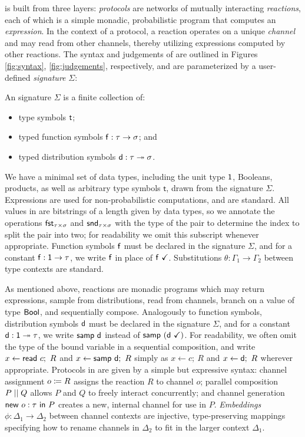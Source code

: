 \ipdl is built from three layers: \emph{protocols} are networks of
mutually interacting \emph{reactions}, each of which is a simple monadic, probabilistic program that computes an \emph{expression}. In the context of a protocol, a reaction operates on a unique \emph{channel} and may read from other channels, thereby utilizing expressions computed by other reactions. The syntax and judgements of \ipdl are outlined in Figures \ref{fig:syntax}, \ref{fig:judgements}, respectively, and are parameterized by a user-defined \emph{signature} $\Sigma$:

\begin{definition}[Signature]
An \ipdl signature $\Sigma$ is a finite collection of:
\begin{itemize}
\item type symbols $\mathsf{t}$;
\item typed function symbols $\mathsf{f} : \tau \rightarrow \sigma$; and
\item typed distribution symbols $\mathsf{d} : \tau \twoheadrightarrow \sigma$.
\end{itemize}
\end{definition}

We have a minimal set of data types, including the unit type $\mathsf{1}$, Booleans, products, as well as arbitrary type symbols $\mathsf{t}$, drawn from the signature $\Sigma$. Expressions are used for non-probabilistic computations, and are standard. All values in \ipdl are bitstrings of a length given by data types, so we annotate the operations $\mathsf{fst}_{\tau \times \sigma}$ and $\mathsf{snd}_{\tau \times \sigma}$ with the type of the pair to determine the index to split the pair into two; for readability we omit this subscript whenever appropriate. Function symbols $\mathsf{f}$ must be declared in the signature $\Sigma$, and for a constant $\mathsf{f} : \mathsf{1} \rightarrow \tau$, we write $\mathsf{f}$ in place of $\mathsf{f} \ \checkmark$. Substitutions $\theta : \Gamma_1 \to \Gamma_2$ between type contexts are standard.

As mentioned above, reactions are monadic programs which may return expressions, sample from distributions, read from channels, branch on a value of type $\mathsf{Bool}$, and sequentially compose. Analogously to function symbols, distribution symbols $\mathsf{d}$ must be declared in the signature $\Sigma$, and for a constant $\mathsf{d} : \mathsf{1} \twoheadrightarrow \tau$, we write $\mathsf{samp} \ \mathsf{d}$ instead of $\mathsf{samp} \ (\mathsf{d} \ \checkmark)$. For readability, we often omit the type of the bound variable in a sequential composition, and write $x \leftarrow \mathsf{read} \ c; \ R$ and $x \leftarrow \mathsf{samp} \ \mathsf{d}; \ R$ simply as $x \leftarrow c; \ R$ and $x \leftarrow \mathsf{d}; \ R$ wherever appropriate. Protocols in \ipdl are given by a simple but expressive syntax: channel assignment $o \coloneqq R$ assigns the reaction $R$ to channel $o$; parallel composition $P \; || \; Q$ allows $P$ and $Q$ to freely interact concurrently; and channel generation $\mathsf{new} \ o : \tau \ \mathsf{in} \ P$ creates a new, internal channel for use in $P$. \emph{Embeddings} $\phi : \Delta_1 \to \Delta_2$ between channel contexts are injective, type-preserving mappings specifying how to rename channels in $\Delta_2$ to fit in the larger context $\Delta_1$.

